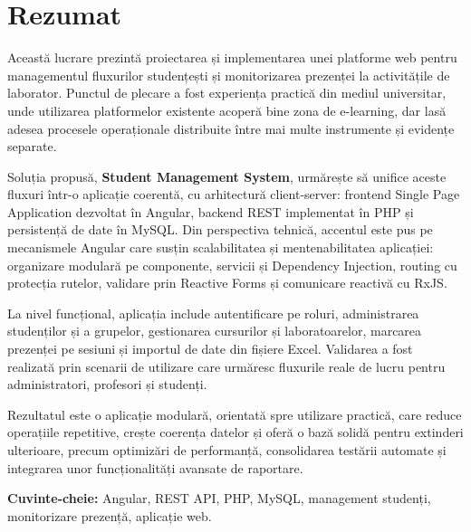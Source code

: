 \newpage
\chapter*{Rezumat}

Această lucrare prezintă proiectarea și implementarea unei platforme web pentru managementul fluxurilor studențești și monitorizarea prezenței la activitățile de laborator. Punctul de plecare a fost experiența practică din mediul universitar, unde utilizarea platformelor existente acoperă bine zona de e-learning, dar lasă adesea procesele operaționale distribuite între mai multe instrumente și evidențe separate.

Soluția propusă, \textbf{Student Management System}, urmărește să unifice aceste fluxuri într-o aplicație coerentă, cu arhitectură client-server: frontend Single Page Application dezvoltat în Angular, backend REST implementat în PHP și persistență de date în MySQL. Din perspectiva tehnică, accentul este pus pe mecanismele Angular care susțin scalabilitatea și mentenabilitatea aplicației: organizare modulară pe componente, servicii și Dependency Injection, routing cu protecția rutelor, validare prin Reactive Forms și comunicare reactivă cu RxJS.

La nivel funcțional, aplicația include autentificare pe roluri, administrarea studenților și a grupelor, gestionarea cursurilor și laboratoarelor, marcarea prezenței pe sesiuni și importul de date din fișiere Excel. Validarea a fost realizată prin scenarii de utilizare care urmăresc fluxurile reale de lucru pentru administratori, profesori și studenți.

Rezultatul este o aplicație modulară, orientată spre utilizare practică, care reduce operațiile repetitive, crește coerența datelor și oferă o bază solidă pentru extinderi ulterioare, precum optimizări de performanță, consolidarea testării automate și integrarea unor funcționalități avansate de raportare.

\textbf{Cuvinte-cheie:} Angular, REST API, PHP, MySQL, management studenți, monitorizare prezență, aplicație web.